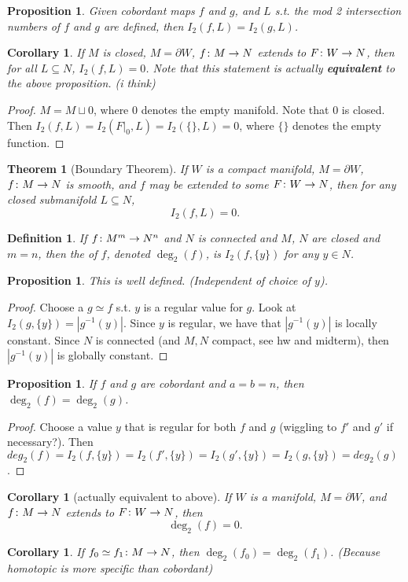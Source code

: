 \documentclass[11pt]{amsbook}
\theoremstyle{mystyle} %
\newtheorem{thrm}[thm]{Theorem}
\newtheorem{defi}[thm]{Definition}
\newtheorem{coro}[thm]{Corollary}
\newtheorem{propo}[thm]{Proposition}
\numberwithin{thm}{section}
\newcommand{\homotopic}{\simeq}
\renewcommand{\d}{\partial}
\begin{document}
\begin{propo}
	Given cobordant maps $f$ and $g$, and $L$ s.t. the mod 2 intersection numbers of $f$ and $g$ are defined, then $I_2(f, L) = I_2(g, L)$.
\end{propo}
\begin{coro}
	If $M$ is closed, $M = \d W$, $f\colon M \to N$ extends to $F\colon W \to N$, then for all $L \subseteq N$, $I_2(f, L) = 0$.  Note that this statement is actually \textbf{equivalent} to the above proposition. (i think)
\end{coro}
\begin{proof}
	$M = M \sqcup 0$, where 0 denotes the empty manifold.  Note that 0 is closed.  Then $I_2(f, L) = I_2(F|_0, L) = I_2(\{\}, L) = 0$, where $\{\}$ denotes the empty function.
\end{proof}
\begin{thrm}[Boundary Theorem]
	If $W$ is a compact manifold, $M = \d W$, $f\colon M \to N$ is smooth, and $f$ may be extended to some $F\colon W \to N$, then for any closed submanifold $L \subseteq N$, $$I_2(f, L) = 0.$$
\end{thrm}
\begin{defi}
	If $f \colon M^m \to N^n$ and $N$ is connected and $M$, $N$ are closed and $m=n$, then the  of $f$, denoted $\deg_2(f)$, is $I_2(f, \{y\})$ for any $y \in N$.
\end{defi}

\begin{propo}
	This is well defined.  (Independent of choice of $y$).
\end{propo}
\begin{proof}
	Choose a $g \homotopic f$ s.t. $y$ is a regular value for $g$.  Look at $I_2(g, \{y\}) = |g^{-1}(y)|$.  Since $y$ is regular, we have that $|g^{-1}(y)|$ is locally constant.  Since $N$ is connected (and $M,N$ compact, see hw and midterm), then $|g^{-1}(y)|$ is globally constant.
\end{proof}
\begin{propo}
	If $f$ and $g$ are cobordant and $a=b=n$, then \\$\deg_2(f) = \deg_2(g)$.
\end{propo}
\begin{proof}
	Choose a value $y$ that is regular for both $f$ and $g$ (wiggling to $f'$ and $g'$ if necessary?).  Then $deg_2(f) = I_2(f, \{y\}) = I_2(f', \{y\}) = I_2(g', \{y\}) = I_2(g, \{y\}) = deg_2(g)$.
\end{proof}
\begin{coro}[actually equivalent to above]
	If $W$ is a manifold, $M = \d W$, and
	$f\colon M \to N$
	extends to $F\colon W \to N$,
	then $$\deg_2(f) = 0.$$
\end{coro}
\begin{coro}
	If $f_0 \homotopic f_1\from M \to N$, then $\deg_2(f_0) = \deg_2(f_1)$.  (Because homotopic is more specific than cobordant)
\end{coro}
\end{document}
